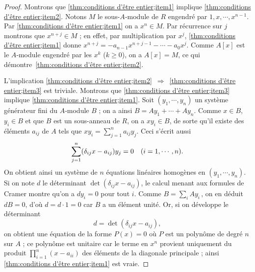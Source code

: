 \documentclass[11pt, %
  title in boldface,
  theorem in new line,
  theorem numbering = section,
  number theorems separately,
  simple name,
]{beaulivre}
\begin{document}
    \begin{proof}
        Montrons que \ref{thm:conditions d'être entier;item1} implique \ref{thm:conditions d'être entier;item2}. Notons \( M \) le sous-\( A \)‑module de \( R \) engendré par \( 1, x, \cdots, x^{n-1} \). Par \ref{thm:conditions d'être entier;item1} on a \( x^n \in M \). Par récurrence sur \( j \) montrons que \( x^{n+j} \in M \) ; en effet, par multiplication par \( x^j \), \ref{thm:conditions d'être entier;item1} donne \( x^{n+j} = - a_{n-1}x^{n+j-1} - \cdots - a_0 x^j \). Comme \( A[x] \) est le \( A \)‑module engendré par les \( x^k \) (\( k \geqslant 0 \)), on a \( A[x] = M \), ce qui démontre~\ref{thm:conditions d'être entier;item2}.

        L'implication \ref{thm:conditions d'être entier;item2}~\( \Rightarrow \)~\ref{thm:conditions d'être entier;item3} est triviale. Montrons que \ref{thm:conditions d'être entier;item3} implique \ref{thm:conditions d'être entier;item1}. Soit \( (y_1, \cdots, y_n) \) un système générateur fini du \( A \)‑module \( B \) ; on a ainsi \( B = Ay_1 + \cdots + Ay_n \). Comme \( x \in B \), \( y_i \in B \) et que \( B \) est un sous-anneau de \( R \), on a \( x y_i \in B \), de sorte qu'il existe des éléments \( a_{ij} \) de \( A \) tels que \( x y_i = \sum_{j=1}^n a_{ij}y_j \). Ceci s'écrit aussi
        \[
            \sum_{j=1}^n (\delta_{ij}x - a_{ij})y_j = 0 \quad \text{(\( i = 1, \cdots, n \))}.
        \]
        On obtient ainsi un système de \( n \) équations linéaires homogènes en \( (y_1, \cdots, y_n) \). Si on note \( d \) le déterminant \( \det(\delta_{ij}x - a_{ij}) \), le calcul menant aux formules de Cramer montre qu'on a \( d y_i = 0 \) pour tout \( i \). Comme \( B = \sum_i A y_i \)\,, on en déduit \( d B = 0 \), d'où \( d = d \cdot 1 = 0 \) car \( B \) a un élément unité. Or, si on développe le déterminant
        \[
            d = \det(\delta_{ij}x - a_{ij}),
        \]
        on obtient une équation de la forme \( P(x) = 0 \) où \( P \) est un polynôme de degré \( n \) sur \( A \) ; ce polynôme est unitaire car le terme en \( x^n \) provient uniquement du produit \( \prod_{i=1}^n (x-a_{ii}) \) des éléments de la diagonale principale ; ainsi \ref{thm:conditions d'être entier;item1} est vraie.
    \end{proof}
\end{document}
